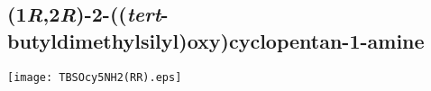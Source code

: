 \subsection{(1\textit{R},2\textit{R})\hyp{}2\hyp{}((\textit{tert}\hyp{}butyldimethylsilyl)oxy)cyclopentan\hyp{}1\hyp{}amine }


\begin{scheme}[H]
	\begin{center}
		\texttt{[image: TBSOcy5NH2(RR).eps]}
	\end{center}
\end{scheme}

